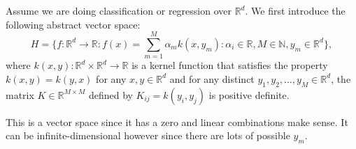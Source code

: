 Assume we are doing classification or regression over
$\mathbb{R}^d$. We first introduce the following abstract vector space:
\begin{equation}
H = \{f:\mathbb{R}^d\to \mathbb R: f(x)= \sum_{m=1}^M\alpha_m k(x,y_m):\alpha_i\in\mathbb R, M\in\mathbb N, y_m\in \mathbb R^d\},
\end{equation}
where $k(x,y):\mathbb R^d\times \mathbb R^d\to\mathbb R$ is a kernel
function that satisfies the property $k(x,y) = k(y,x)$ for any $x,y\in
\mathbb R^d$ and for any distinct $y_1,y_2,\dots, y_M\in\mathbb R^d$,
the matrix $K\in\mathbb R^{M\times M}$ defined by $K_{ij}=k(y_i,y_j)$
is positive definite.

This is a vector space since it has a zero and linear combinations make
sense. It can be infinite-dimensional however since there are lots of
possible $y_m$. 

